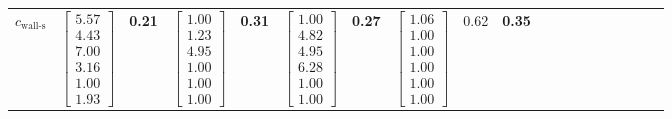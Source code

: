 \documentclass[journal]{IEEEtran}
\begin{document}
\begin{table}[tbh]
\begin{tabular}{l | cc cc cc cc c | cc cc cc cc c}
        $c_{\text{wall-s}}$
        & \multicolumn{1}{c}{$\begin{bmatrix} 5.57\\4.43\\7.00\\3.16\\1.00\\1.93 \end{bmatrix}$} & \textbf{0.21}
        & \multicolumn{1}{c}{$\begin{bmatrix} 1.00\\1.23\\4.95\\1.00\\1.00\\1.00 \end{bmatrix}$} & \textbf{0.31}
        & \multicolumn{1}{c}{$\begin{bmatrix} 1.00\\4.82\\4.95\\6.28\\1.00\\1.00 \end{bmatrix}$} & \textbf{0.27}
        & \multicolumn{1}{c}{$\begin{bmatrix} 1.06\\1.00\\1.00\\1.00\\1.00\\1.00 \end{bmatrix}$} & 0.62 & \textbf{0.35}
        
        

\end{tabular}
\end{table}
\end{document}
